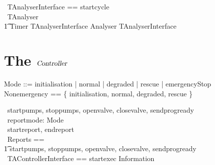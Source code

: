 \documentclass{report} %
\begin{document}
\begin{circus}
    \circchannelset\ TAnalyserInterface == \lchanset startcycle \rchanset \\
    \circprocess\ TAnalyser \circdef \\
        \t1 Timer \lpar TAnalyserInterface \rpar Analyser \circhide TAnalyserInterface
\end{circus}



\chapter{The $\mathsl{Controller}$}

\begin{zed}
  Mode ::= initialisation | normal | degraded | rescue | emergencyStop \\
  Nonemergency == \{ initialisation, normal, degraded, rescue \}
\end{zed}

\begin{circus}
    \circchannel\ startpumps, stoppumps, openvalve, closevalve, sendprogready \\
    \circchannel\ reportmode: Mode \\
    \circchannel\ startreport, endreport \\
    \circchannelset\ Reports == \\
        \t1 \lchanset startpumps, stoppumps, openvalve, closevalve, sendprogready \rchanset \\
    \circchannelset\ TAControllerInterface ==  \lchanset startexec \rchanset \cup Information
\end{circus}

%
%
\end{document}
